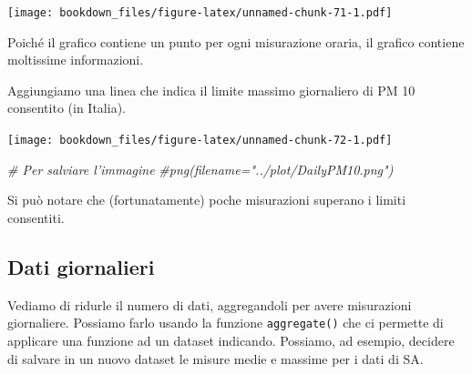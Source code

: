 \documentclass[]{book}
\newenvironment{Shaded}{\begin{snugshade}}{\end{snugshade}}
\newcommand{\CommentTok}[1]{\textcolor[rgb]{0.56,0.35,0.01}{\textit{#1}}}
\newcommand{\DataTypeTok}[1]{\textcolor[rgb]{0.13,0.29,0.53}{#1}}
\newcommand{\DecValTok}[1]{\textcolor[rgb]{0.00,0.00,0.81}{#1}}
\newcommand{\FloatTok}[1]{\textcolor[rgb]{0.00,0.00,0.81}{#1}}
\newcommand{\KeywordTok}[1]{\textcolor[rgb]{0.13,0.29,0.53}{\textbf{#1}}}
\newcommand{\NormalTok}[1]{#1}
\newcommand{\OperatorTok}[1]{\textcolor[rgb]{0.81,0.36,0.00}{\textbf{#1}}}
\newcommand{\StringTok}[1]{\textcolor[rgb]{0.31,0.60,0.02}{#1}}
\begin{document}
\texttt{[image: bookdown\_files/figure-latex/unnamed-chunk-71-1.pdf]}

Poiché il grafico contiene un punto per ogni misurazione oraria, il grafico contiene moltissime informazioni.

Aggiungiamo una linea che indica il limite massimo giornaliero di PM 10 consentito (in Italia).

\begin{Shaded}
\end{Shaded}

\texttt{[image: bookdown\_files/figure-latex/unnamed-chunk-72-1.pdf]}

\begin{Shaded}
\begin{Highlighting}[]
\CommentTok{# Per salviare l'immagine}
\CommentTok{#png(filename="../plot/DailyPM10.png")}
\end{Highlighting}
\end{Shaded}

Si può notare che (fortunatamente) poche misurazioni superano i limiti consentiti.

\hypertarget{dati-giornalieri}{%
\subsection{Dati giornalieri}\label{dati-giornalieri}}

Vediamo di ridurle il numero di dati, aggregandoli per avere misurazioni giornaliere. Possiamo farlo usando la funzione \texttt{aggregate()} che ci permette di applicare una funzione ad un dataset indicando. Possiamo, ad esempio, decidere di salvare in un nuovo dataset le misure medie e massime per i dati di SA.

\begin{Shaded}
\end{Shaded}
\end{document}

